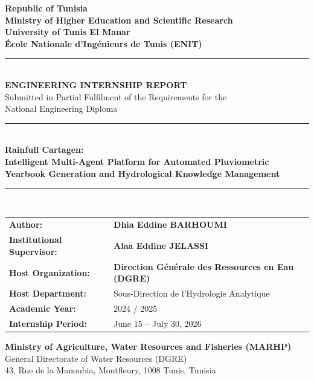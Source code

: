 \documentclass[12pt,a4paper]{report}
\begin{document}
\begin{titlepage}
\begin{center}

\textbf{\large Republic of Tunisia}\\[0.15cm]
\textbf{\large Ministry of Higher Education and Scientific Research}\\[0.15cm]
\textbf{\large University of Tunis El Manar}\\[0.15cm]
\textbf{\Large École Nationale d'Ingénieurs de Tunis (ENIT)}\\[0.4cm]

\rule{\linewidth}{0.6pt}\\[0.4cm]

{\Large\textbf{ENGINEERING INTERNSHIP REPORT}}\\[0.25cm]
{\large Submitted in Partial Fulfilment of the Requirements for the}\\[0.15cm]
{\large National Engineering Diploma}\\[0.5cm]

\rule{\linewidth}{0.4pt}\\[0.6cm]

{\Huge\textbf{Rainfull Cartagen:}}\\[0.4cm]
{\LARGE\textbf{Intelligent Multi-Agent Platform for Automated Pluviometric Yearbook Generation and Hydrological Knowledge Management}}\\[0.6cm]

\rule{\linewidth}{0.4pt}\\[0.8cm]

\begin{minipage}{0.85\textwidth}
\begin{tabular}{ll}
\textbf{Author:} & \textbf{Dhia Eddine BARHOUMI} \\[0.3cm]
\textbf{Institutional Supervisor:} & \textbf{Alaa Eddine JELASSI} \\[0.3cm]
\textbf{Host Organization:} & \textbf{Direction Générale des Ressources en Eau (DGRE)} \\[0.3cm]
\textbf{Host Department:} & Sous-Direction de l'Hydrologie Analytique \\[0.3cm]
\textbf{Academic Year:} & 2024 / 2025 \\[0.3cm]
\textbf{Internship Period:} & June 15 -- July 30, 2026 \\
\end{tabular}
\end{minipage}

\vfill

\textbf{Ministry of Agriculture, Water Resources and Fisheries (MARHP)}\\
General Directorate of Water Resources (DGRE)\\
43, Rue de la Manoubia, Montfleury, 1008 Tunis, Tunisia

\end{center}
\end{titlepage}
\end{document}
